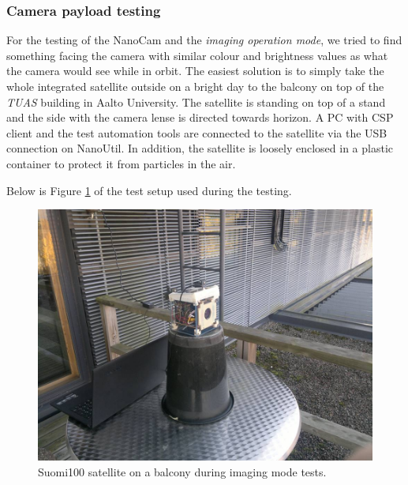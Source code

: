 \documentclass[english,12pt,a4paper,pdftex,elec,utf8]{aaltothesis}
\begin{document}
\subsubsection{Camera payload testing}
For the testing of the NanoCam and the \textit{imaging operation mode}, we tried to find something facing the camera with similar colour and brightness values as what the camera would see while in orbit. The easiest solution is to simply take the whole integrated satellite outside on a bright day to the balcony on top of the \textit{TUAS} building in Aalto University. The satellite is standing on top of a stand and the side with the camera lense is directed towards horizon. A PC with CSP client and the test automation tools are connected to the satellite via the USB connection on NanoUtil. In addition, the satellite is loosely enclosed in a plastic container to protect it from particles in the air.\par 
Below is Figure \ref{camerabalcony} of the test setup used during the testing.\par 
\begin{figure}[h!]
\centering
\includegraphics[scale=0.3]{camerabucketspurgu}
\caption{Suomi100 satellite on a balcony during imaging mode tests.}
\label{camerabalcony}
\end{figure} 
\end{document}
